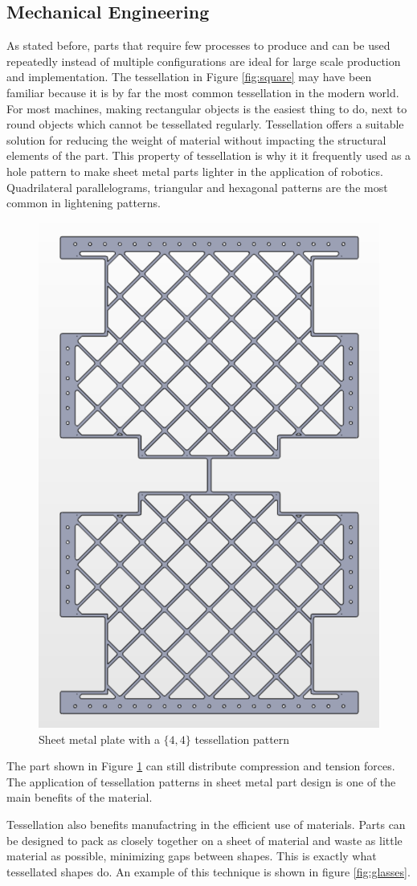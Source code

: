 \documentclass[12pt,letterpaper]{article}
\begin{document}
\subsection{Mechanical Engineering}
As stated before, parts that require few processes to produce and can be used repeatedly instead of multiple configurations are ideal for large scale production and implementation. The tessellation in Figure \ref{fig:square} may have been familiar because it is by far the most common tessellation in the modern world. For most machines, making rectangular objects is the easiest thing to do, next to round objects which cannot be tessellated regularly. 
Tessellation offers a suitable solution for reducing the weight of material without impacting the structural elements of the part. This property of tessellation is why it it frequently used as a hole pattern to make sheet metal parts lighter in the application of robotics. Quadrilateral parallelograms, triangular and hexagonal patterns are the most common in lightening patterns.

\begin{figure}[H]
    \begin{center}
        \caption{Sheet metal plate with a $\{4,4\}$ tessellation pattern}
        \label{fig:belly}
        \includegraphics[width=.4\linewidth]{belly}
    \end{center}
\end{figure}

The part shown in Figure \ref{fig:belly} can still distribute compression and tension forces. The application of tessellation patterns in sheet metal part design is one of the main benefits of the material.

Tessellation also benefits manufactring in the efficient use of materials. Parts can be designed to pack as closely together on a sheet of material and waste as little material as possible, minimizing gaps between shapes. This is exactly what tessellated shapes do. An example of this technique is shown in figure \ref{fig:glasses}.
\end{document}

